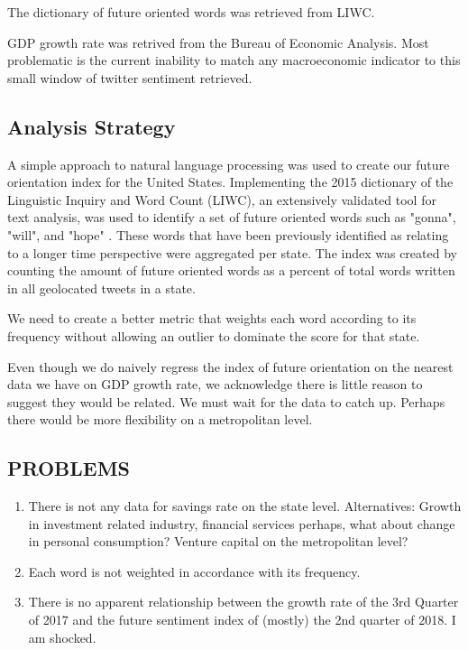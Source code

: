 \documentclass{article}
\begin{document}
The dictionary of future oriented words was retrieved from LIWC. 

GDP growth rate was retrived from the Bureau of Economic Analysis. Most problematic is the current inability to match any macroeconomic indicator to this small window of twitter sentiment retrieved.


\subsection{Analysis Strategy}
A simple approach to natural language processing was used to create our future orientation index for the United States. Implementing the 2015 dictionary of the Linguistic Inquiry and Word Count (LIWC), an extensively validated tool for text analysis, was used to identify a set of future oriented words such as "gonna", "will", and "hope" \cite{pennebaker2015development}. These words that have been previously identified as relating to a longer time perspective were aggregated per state. The index was created by counting the amount of future oriented words as a percent of total words written in all geolocated tweets in a state. 

We need to create a better metric that weights each word according to its frequency without allowing an outlier to dominate the score for that state.

Even though we do naively regress the index of future orientation on the nearest data we have on GDP growth rate, we acknowledge there is little reason to suggest they would be related. We must wait for the data to catch up. Perhaps there would be more flexibility on a metropolitan level.

\subsection{PROBLEMS}

\begin{enumerate}
    \item There is not any data for savings rate on the state level. Alternatives: Growth in investment related industry, financial services perhaps, what about change in personal consumption? Venture capital on the metropolitan level? 
    \item Each word is not weighted in accordance with its frequency.
    \item There is no apparent relationship between the growth rate of the 3rd Quarter of 2017 and the future sentiment index of (mostly) the 2nd quarter of 2018. I am shocked.
\end{enumerate}
\end{document}
